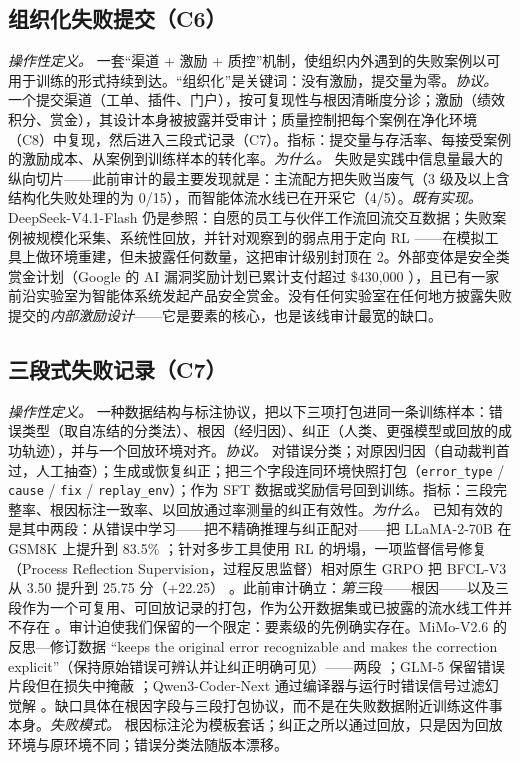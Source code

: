 \documentclass[10pt,fontset=fandol]{ctexart}
\begin{document}
\subsection{组织化失败提交（C6）}

\emph{操作性定义。} 一套“渠道 + 激励 + 质控”机制，使组织内外遇到的失败案例以可用于训练的形式持续到达。“组织化”是关键词：没有激励，提交量为零。\emph{协议。} 一个提交渠道（工单、插件、门户），按可复现性与根因清晰度分诊；激励（绩效积分、赏金），其设计本身被披露并受审计；质量控制把每个案例在净化环境（C8）中复现，然后进入三段式记录（C7）。指标：提交量与存活率、每接受案例的激励成本、从案例到训练样本的转化率。\emph{为什么。} 失败是实践中信息量最大的纵向切片——此前审计的最主要发现就是：主流配方把失败当废气（3 级及以上含结构化失败处理的为 0/15），而智能体流水线已在开采它（4/5）\cite{ref6}。\emph{既有实现。} DeepSeek-V4.1-Flash 仍是参照：自愿的员工与伙伴工作流回流交互数据；失败案例被规模化采集、系统性回放，并针对观察到的弱点用于定向 RL \cite{ref20}——在模拟工具上做环境重建，但未披露任何数量，这把审计级别封顶在 2。外部变体是安全类赏金计划（Google 的 AI 漏洞奖励计划已累计支付超过 \$430,000 \cite{ref23}），且已有一家前沿实验室为智能体系统发起产品安全赏金。没有任何实验室在任何地方披露失败提交的\emph{内部激励设计}——它是要素的核心，也是该线审计最宽的缺口。

\subsection{三段式失败记录（C7）}

\emph{操作性定义。} 一种数据结构与标注协议，把以下三项打包进同一条训练样本：错误类型（取自冻结的分类法）、根因（经归因）、纠正（人类、更强模型或回放的成功轨迹），并与一个回放环境对齐。\emph{协议。} 对错误分类；对原因归因（自动裁判首过，人工抽查）；生成或恢复纠正；把三个字段连同环境快照打包（\texttt{error\_type} / \texttt{cause} / \texttt{fix} / \texttt{replay\_env}）；作为 SFT 数据或奖励信号回到训练。指标：三段完整率、根因标注一致率、以回放通过率测量的纠正有效性。\emph{为什么。} 已知有效的是其中两段：从错误中学习——把不精确推理与纠正配对——把 LLaMA-2-70B 在 GSM8K 上提升到 83.5\% \cite{ref24}；针对多步工具使用 RL 的坍塌，一项监督信号修复（Process Reflection Supervision，过程反思监督）相对原生 GRPO 把 BFCL-V3 从 3.50 提升到 25.75 分（+22.25） \cite{ref25}。此前审计确立：\emph{第三}段——根因——以及三段作为一个可复用、可回放记录的打包，作为公开数据集或已披露的流水线工件并不存在 \cite{ref6}。审计迫使我们保留的一个限定：要素级的先例确实存在。MiMo-V2.6 的反思—修订数据 ``keeps the original error recognizable and makes the correction explicit''（保持原始错误可辨认并让纠正明确可见）——两段 \cite{ref26}；GLM-5 保留错误片段但在损失中掩蔽 \cite{ref27}；Qwen3-Coder-Next 通过编译器与运行时错误信号过滤幻觉解 \cite{ref28}。缺口具体在根因字段与三段打包协议，而不是在失败数据附近训练这件事本身。\emph{失败模式。} 根因标注沦为模板套话；纠正之所以通过回放，只是因为回放环境与原环境不同；错误分类法随版本漂移。
\end{document}
